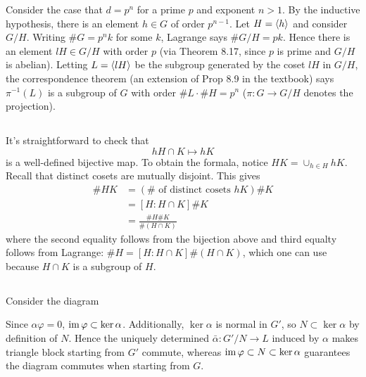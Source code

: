\documentclass[12pt]{article}
\begin{document}
Consider the case that $d = p^n$ for a prime $p$ and exponent $n > 1$.  
By the inductive hypothesis, there is an element $h \in G$ of order $p^{n - 1}$. 
Let $H = \langle h\rangle$ and consider $G / H$. 
Writing $\#G = p^n k$ for some $k$, Lagrange says $\#G/H = pk$. 
Hence there is an element $lH \in G / H$ with order $p$ (via Theorem 8.17, since $p$ is prime and $G / H$ is abelian). 
Letting $L = \langle lH\rangle$ be the subgroup generated by the coset $lH$ in $G / H$, the correspondence theorem (an extension of Prop 8.9 in the textbook) says $\pi^{-1} (L)$ is a subgroup of $G$ with order $\#L \cdot \#H = p^n$ ($\pi: G \rightarrow G / H$ denotes the projection).  

\subsection{}
It's straightforward to check that 
$$h H \cap K \mapsto hK$$ 
is a well-defined bijective map. 
To obtain the formala, notice $HK = \cup_{h \in H} hK$. 
Recall that distinct cosets are mutually disjoint. 
This gives
\begin{align*}
  \#HK & = (\# \text{ of distinct cosets } hK) \#K \\ 
       & = [H:H \cap K] \#K  \\ 
       & = \frac{\#H \#K}{\#(H \cap K)}
\end{align*}
where the second equality follows from the bijection above and third equalty follows from Lagrange: 
$\#H = [H : H \cap K]\#(H \cap K)$, which one can use because $H \cap K$ is a subgroup of $H$. 

\subsection{} 
Consider the diagram 
\begin{center}
\end{center}
Since $\alpha \varphi = 0$, $\operatorname{im} \varphi \subset \ker \alpha$. 
Additionally, $\ker \alpha$ is normal in $G'$, so $N \subset \ker \alpha$ by definition of $N$. 
Hence the uniquely determined $\bar{\alpha}:G'/N \rightarrow L$ induced by $\alpha$ makes triangle block starting from $G'$ commute, whereas $\operatorname{im} \varphi \subset N \subset \ker \alpha$ guarantees the diagram commutes when starting from $G$. 
\end{document}
